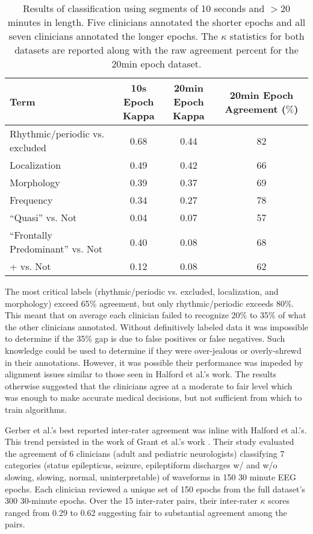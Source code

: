 \begin{table}[ht]
\caption[Gerber's Long Versus Short Segment Classification]{Results of classification using segments of 10 seconds and $>20$ minutes in length. Five clinicians annotated the shorter epochs and all seven clinicians annotated the longer epochs. The $\kappa$ statistics for both datasets are reported along with the raw agreement percent for the 20min epoch dataset.}
\centering
\begin{tabular}{l c c c}
\toprule
Term & \makecell{10s Epoch \\ Kappa} & \makecell{20min Epoch \\ Kappa} & \makecell{20min Epoch\\ Agreement ($\%$)}\\
\midrule
Rhythmic/periodic vs. excluded			& 0.68 & 0.44 & 82\\
Localization							& 0.49 & 0.42 & 66\\
Morphology							& 0.39 & 0.37 & 69\\
Frequency								& 0.34 & 0.27 & 78\\
``Quasi'' vs. Not						& 0.04 & 0.07 & 57\\
``Frontally Predominant'' vs. Not		& 0.40 & 0.08 & 68\\
+ vs. Not								& 0.12 & 0.08 & 62\\
\bottomrule
\end{tabular}
\label{tab:gerber_inter}
\end{table}

The most critical labels (rhythmic/periodic vs. excluded, localization, and morphology) exceed 65\% agreement, but only rhythmic/periodic exceeds 80\%. This meant that on average each clinician failed to recognize 20\% to 35\% of what the other clinicians annotated. Without definitively labeled data it was impossible to determine if the 35\% gap is due to false positives or false negatives. Such knowledge could be used to determine if they were over-jealous or overly-shrewd in their annotations. However, it was possible their performance was impeded by alignment issues similar to those seen in Halford et al.'s work. The results otherwise suggested that the clinicians agree at a moderate to fair level which was enough to make accurate medical decisions, but not sufficient from which to train algorithms.

Gerber et al.'s best reported inter-rater agreement was inline with Halford et al.'s. This trend persisted in the work of Grant et al.'s work \cite{Grant2014}. Their study evaluated the agreement of 6 clinicians (adult and pediatric neurologists) classifying 7 categories (status epilepticus, seizure, epileptiform discharges w/ and w/o slowing, slowing, normal, uninterpretable) of waveforms in 150 30 minute \ac{EEG} epochs. Each clinician reviewed a unique set of 150 epochs from the full dataset's 300 30-minute epochs. Over the 15 inter-rater pairs, their inter-rater $\kappa$ scores ranged from 0.29 to 0.62 suggesting fair to substantial agreement among the pairs.

